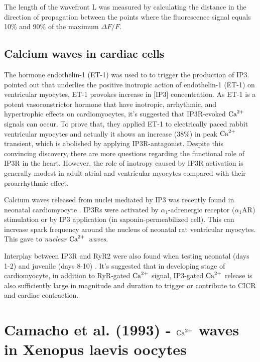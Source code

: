 The length of the wavefront L was measured by calculating the distance in the
direction of propagation between the points where the fluorescence signal equals
10\% and 90\% of the maximum $\Delta F/F$.



\subsection{Calcium waves in cardiac cells}

The hormone endothelin-1 (ET-1) was used to to trigger the production of IP3.
\citep{domeier2008} pointed out that underlies the positive inotropic action of
endothelin-1 (ET-1) on ventricular myocytes, ET-1 provokes increase in [IP3]
concentration. As ET-1 is a potent vasoconstrictor hormone that have inotropic,
arrhythmic, and hypertrophic effects on cardiomyocytes, it's suggested that
IP3R-evoked ${\text{Ca}^{2+}}$ signals can occur. To prove that, they applied ET-1 to
electrically paced rabbit ventricular myocytes and actually it shows an increase
(38\%) in peak ${\text{Ca}^{2+}}$ transient, which is abolished by applying IP3R-antagonist.
Despite this convincing discovery, there are more questions regarding the
functional role of IP3R in the heart. However, the role of inotropy caused by
IP3R activation is generally modest in adult atrial and ventricular myocytes
compared with their proarrhythmic effect. 

Calcium waves released from nuclei mediated by IP3 was recently found in
neonatal cardiomyocyte \citep{luo2008}. IP3Rs were activated by
$\alpha_1$-adrenergic receptor ($\alpha_1$AR) stimulation or by IP3 application
(in saponin-permeabilized cell).  This can increase spark frequency around the
nucleus of neonatal rat ventricular myocytes. This gave to {\it nuclear ${\text{Ca}^{2+}}$
waves}. 

Interplay between IP3R and RyR2 were also found when testing neonatal (days 1-2)
and juvenile (days 8-10) \citep{janowski2010}. It's suggested that in developing
stage of cardiomyocyte, in addition to RyR-gated ${\text{Ca}^{2+}}$ signal, IP3-gated ${\text{Ca}^{2+}}$
release is also sufficiently large in magnitude and duration to trigger or
contribute to CICR and cardiac contraction. 

\section[Camacho et al. (1993)]{Camacho et al. (1993) - ${\text{Ca}^{2+}}$ waves in Xenopus
laevis oocytes}

\citep{camacho1993}

